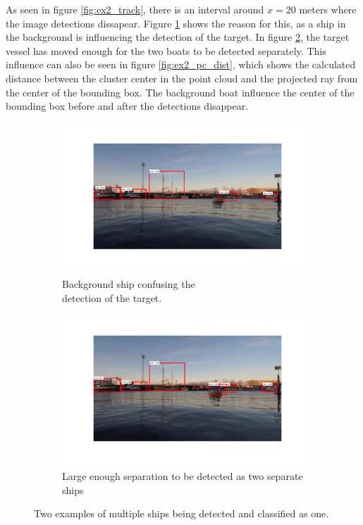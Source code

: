As seen in figure \ref{fig:ex2_track}, there is an interval around $x=20$ meters where the image detections dissapear. Figure \ref{fig:sub_ex2_issue} shows the reason for this, as a ship in the background is influencing the detection of the target. In figure \ref{fig:sub_ex2_issue2}, the target vessel has moved enough for the two boats to be detected separately. This influence can also be seen in figure \ref{fig:ex2_pc_dist}, which shows the calculated distance between the cluster center in the point cloud and the projected ray from the center of the bounding box. The background boat influence the center of the bounding box before and after the detections disappear.
\begin{figure}[H]
	\centering
	\begin{subfigure}[t]{.5\linewidth}
		\centering
		\includegraphics[width=\linewidth]{fig/exp_2_problem.png}
		\caption{Background ship confusing the\\ detection of the target.}
		\label{fig:sub_ex2_issue}
	\end{subfigure}%
	\begin{subfigure}[t]{.5\linewidth}
		\centering
		\includegraphics[width=\linewidth]{fig/exp2_past_problem.png}
		\caption{Large enough separation to be detected as two separate ships}
		\label{fig:sub_ex2_issue2}
	\end{subfigure}
	\caption{Two examples of multiple ships being detected and classified as one.}
	\label{fig:issues_ex2}
\end{figure}
